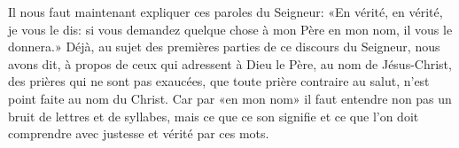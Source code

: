 Il nous faut maintenant expliquer ces paroles du Seigneur:
	«En vérité, en vérité, je vous le dis:
	si vous demandez quelque chose à mon Père en mon nom,
	il vous le donnera.»
Déjà, au sujet des premières parties de ce discours du Seigneur,
	nous avons dit, à propos de ceux qui adressent à Dieu le Père,
		au nom de Jésus-Christ,
	des prières qui ne sont pas exaucées,
	que toute prière contraire au salut,
	n’est point faite au nom du Christ.
Car par «en mon nom» il faut entendre
	non pas un bruit de lettres et de syllabes,
	mais ce que ce son signifie
	et ce que l’on doit comprendre avec justesse et vérité par ces mots.
